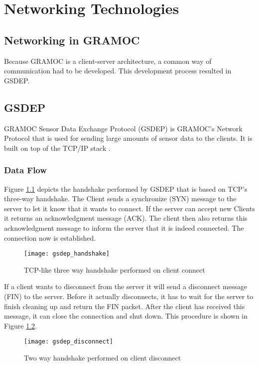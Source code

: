 \chapter{Networking Technologies}
\label{ch:networkingtechnologies}

\section{Networking in GRAMOC}

Because GRAMOC is a client-server architecture, a common way of communication had to be developed. This development process resulted in GSDEP.

\section{GSDEP}

GRAMOC Sensor Data Exchange Protocol (GSDEP) is GRAMOC's Network Protocol that is used for sending large amounts of sensor data to the clients. It is built on top of the TCP/IP stack \cite{rfc793, rfc791}.

\subsection{Data Flow}

Figure \ref{fig:handshake} depicts the handshake performed by GSDEP that is based on TCP's three-way handshake. The Client sends a synchronize (SYN) message to the server to let it know that it wants to connect. If the server can accept new Clients it returns an acknowledgment message (ACK). The client then also returns this acknowledgment message to inform the server that it is indeed connected. The connection now is established.

\begin{figure}[H]
	\centering
	\texttt{[image: gsdep\_handshake]}
	\caption{TCP-like three way handshake performed on client connect}
	\label{fig:handshake}
\end{figure}

If a client wants to disconnect from the server it will send a disconnect message (FIN) to the server. Before it actually disconnects, it has to wait for the server to finish cleaning up and return the FIN packet. After the client has received this message, it can close the connection and shut down. This procedure is shown in Figure \ref{fig:disconnect}.

\begin{figure}[H]
	\centering
	\texttt{[image: gsdep\_disconnect]}
	\caption{Two way handshake performed on client disconnect}
	\label{fig:disconnect}
\end{figure}


